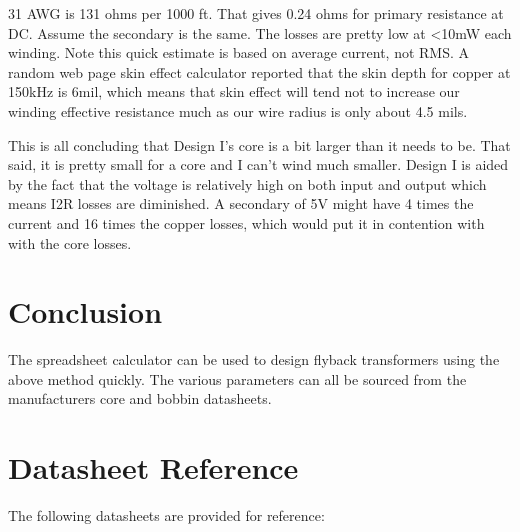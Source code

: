 \documentclass{article}
\begin{document}
31 AWG is 131 ohms per 1000 ft.  That gives 0.24 ohms for primary resistance at DC.  Assume the secondary is the same.  The losses are pretty low at <10mW each winding.  Note this quick estimate is based on average current, not RMS.  A random web page skin effect calculator reported that the skin depth for copper at 150kHz is 6mil, which means that skin effect will tend not to increase our winding effective resistance much as our wire radius is only about 4.5 mils.

This is all concluding that Design I’s core is a bit larger than it needs to be.  That said, it is pretty small for a core and I can’t wind much smaller.  Design I is aided by the fact that the voltage is relatively high on both input and output which means I2R losses are diminished.  A secondary of 5V might have 4 times the current and 16 times the copper losses, which would put it in contention with with the core losses.

\section{Conclusion}

The spreadsheet calculator can be used to design flyback transformers using the above method quickly.  The various parameters can all be sourced from the manufacturers core and bobbin datasheets.

\appendix
\section{Datasheet Reference}
The following datasheets are provided for reference:

%


\printbibliography
\end{document}
